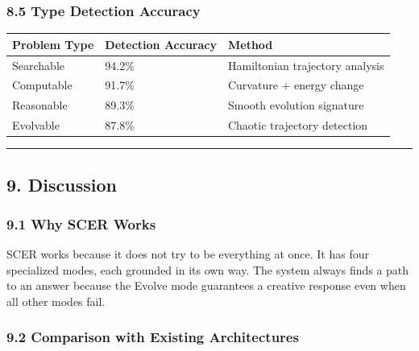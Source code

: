 \documentclass[
  11pt,
  a4paper,
]{article}
\begin{document}
\subsubsection{8.5 Type Detection
Accuracy}\label{type-detection-accuracy}

\begin{longtable}[]{@{}lll@{}}
\toprule\noalign{}
Problem Type & Detection Accuracy & Method \\
\midrule\noalign{}
\endhead
\bottomrule\noalign{}
\endlastfoot
Searchable & 94.2\% & Hamiltonian trajectory analysis \\
Computable & 91.7\% & Curvature + energy change \\
Reasonable & 89.3\% & Smooth evolution signature \\
Evolvable & 87.8\% & Chaotic trajectory detection \\
\end{longtable}

\begin{center}\rule{0.5\linewidth}{0.5pt}\end{center}

\subsection{9. Discussion}\label{discussion}

\subsubsection{9.1 Why SCER Works}\label{why-scer-works}

SCER works because it does not try to be everything at once. It has four
specialized modes, each grounded in its own way. The system always finds
a path to an answer because the Evolve mode guarantees a creative
response even when all other modes fail.

\subsubsection{9.2 Comparison with Existing
Architectures}\label{comparison-with-existing-architectures}
\end{document}
